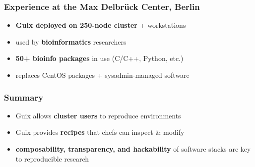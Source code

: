 \documentclass{beamer}
\begin{document}
\begin{frame}
  \frametitle{Experience at the Max Delbrück Center, Berlin}

  \large{
  \begin{itemize}
    \item \textbf{Guix deployed on 250-node cluster} + workstations
    \item used by \textbf{bioinformatics} researchers
    \item \textbf{50+ bioinfo packages} in use (C/C++, Python,
      etc.)
    \item replaces CentOS packages + sysadmin-managed software
  \end{itemize}
  }
\end{frame}


\begin{frame}
  \frametitle{Summary}

  \Large{
    \begin{itemize}
    \item<1-> Guix allows \alert{\textbf{cluster users}} to reproduce
      environments
    \item<2-> Guix provides \alert{\textbf{recipes}} that chefs can
      inspect \& modify
    \item<3-> \alert{\textbf{composability, transparency, and
        hackability}} of software stacks are key to reproducible
      research
    \end{itemize}
  }
\end{frame}

\begin{frame}[plain]
\end{frame}
\end{document}
